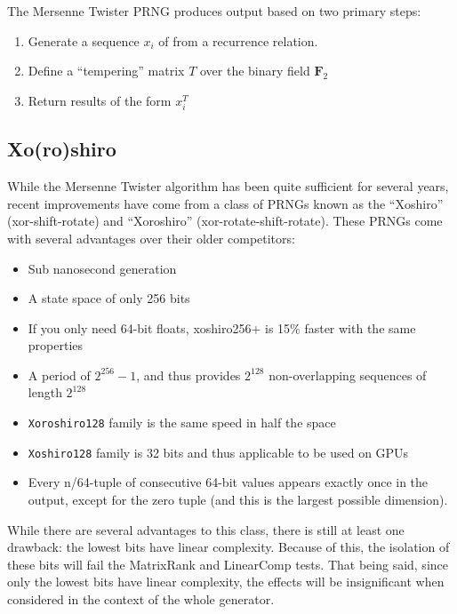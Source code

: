 \documentclass{article}
\begin{document}
            The Mersenne Twister PRNG produces output based on two primary steps:

            \begin{enumerate}
                \item Generate a sequence $x_i$ of from a recurrence relation.
                \item Define a ``tempering'' matrix $T$ over the binary field $\mathbf{F}_2$
                \item Return results of the form $x_i^T$
            \end{enumerate}

        \subsection*{Xo(ro)shiro}

            While the Mersenne Twister algorithm has been quite sufficient for several years, recent improvements have come from a class of PRNGs known as the ``Xoshiro'' (xor-shift-rotate) and ``Xoroshiro'' (xor-rotate-shift-rotate).  These PRNGs come with several advantages over their older competitors\cite{XoroshiroPaper, Shootout}:

            \begin{itemize}
                \item Sub nanosecond generation
                \item A state space of only 256 bits
                \item If you only need 64-bit floats, xoshiro256+ is 15\% faster with the same properties
                \item A period of $2^{256} - 1$, and thus provides $2^{128}$ non-overlapping sequences of length $2^{128}$
                \item \texttt{Xoroshiro128} family is the same speed in half the space
                \item \texttt{Xoshiro128} family is 32 bits and thus applicable to be used on GPUs
                \item Every n/64-tuple of consecutive 64-bit values appears exactly once in the output, except for the zero tuple (and this is the largest possible dimension).
            \end{itemize}

            While there are several advantages to this class, there is still at least one drawback: the lowest bits have linear complexity.  Because of this, the isolation of these bits will fail the MatrixRank and LinearComp tests\cite{LowComp, TestU01}.  That being said, since only the lowest bits have linear complexity, the effects will be insignificant when considered in the context of the whole generator\cite{LowComp}.
\end{document}
